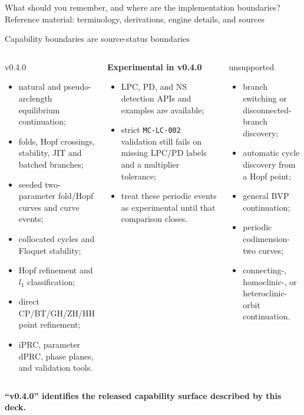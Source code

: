   {What should you remember, and where are the implementation boundaries?}
  {Reference material: terminology, derivations, engine details, and sources}

\begin{frame}{Capability boundaries are source-status boundaries}
\scriptsize
\begin{columns}[T,onlytextwidth]
\begin{block}{\releasedbadge\quad v0.4.0}
\begin{itemize}
  \item natural and pseudo-arclength equilibrium continuation;
  \item folds, Hopf crossings, stability, JIT and batched branches;
  \item seeded two-parameter fold/Hopf curves and curve events;
  \item collocated cycles and Floquet stability;
  \item Hopf refinement and $l_1$ classification;
  \item direct CP/BT/GH/ZH/HH point refinement;
  \item iPRC, parameter dPRC, phase planes, and validation tools.
\end{itemize}
\end{block}

\begin{block}{\textcolor{JaxOrange}{\bfseries Experimental in v0.4.0}}
\begin{itemize}
  \item LPC, PD, and NS detection APIs and examples are available;
  \item strict \texttt{MC-LC-002} validation still fails on missing LPC/PD labels and a multiplier tolerance;
  \item treat these periodic events as experimental until that comparison closes.
\end{itemize}
\end{block}

\begin{block}{\futurebadge\quad unsupported}
\begin{itemize}
  \item branch switching or disconnected-branch discovery;
  \item automatic cycle discovery from a Hopf point;
  \item general BVP continuation;
  \item periodic codimension-two curves;
  \item connecting-, homoclinic-, or heteroclinic-orbit continuation.
\end{itemize}
\end{block}
\end{columns}

\vfill
\centering
\textbf{``v0.4.0'' identifies the released capability surface described by this deck.}
\end{frame}


